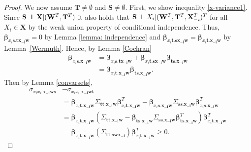 \documentclass[11pt,a4paper]{article}
\theoremstyle{definition}
\theoremstyle{remark}
\newcommand\ci{\protect\mathpalette{\protect\independenT}{\perp}}
\def\independenT#1#2{\mathrel{\rlap{$#1#2$}\mkern2mu{#1#2}}}
\begin{document}
\begin{proof}
We now assume $\mathbf{T} \neq \emptyset$ and $\mathbf{S} \neq \emptyset$.  
First, we show inequality \ref{x-variance1}.  Since $\mathbf{S} \ci \mathbf{X} | (\mathbf{W}^T , \mathbf{T}^T)$ it also holds that $\mathbf{S} \ci X_i | (\mathbf{W}^T, \mathbf{T}^T, \mathbf{X}_{-i}^T)^T$ for all $X_i \in \mathbf{X}$ by the weak union property of conditional independence. %
Thus, $\boldsymbol{\beta}_{x_i\mathbf{s}.\mathbf{tx_{-i}w}} = 0$ by Lemma \ref{lemma: independence} and $\boldsymbol{\beta}_{x_i\mathbf{t}.\mathbf{sx_{-i}w}} = \boldsymbol{\beta}_{x_i\mathbf{t}.\mathbf{x_{-i}w}}$ by Lemma~\ref{Wermuth}. Hence, by Lemma \ref{Cochran}
\[
\begin{aligned}
\boldsymbol{\beta}_{x_i\mathbf{s}.\mathbf{x_{-i}w}} &= \boldsymbol{\beta}_{x_i\mathbf{s}.\mathbf{tx_{-i}w}} + \boldsymbol{\beta}_{x_i\mathbf{t}.\mathbf{sx_{-i}w}}\boldsymbol{\beta}_{\mathbf{ts}.\mathbf{x_{-i}w}} \\ &=\boldsymbol{\beta}_{x_i\mathbf{t}.\mathbf{x_{-i}w}} \boldsymbol{\beta}_{\mathbf{ts}.\mathbf{x_{-i}w}}.
\end{aligned}
\]
Then by Lemma \ref{convarsets},
\[
\begin{aligned}
\sigma_{x_ix_i.\mathbf{x_{-i}ws}} &- \sigma_{x_ix_i.\mathbf{x_{-i}wt}} \\
&=\boldsymbol{\beta}_{x_i\mathbf{t}.\mathbf{x_{-i}w}} \Sigma_{\mathbf{tt}.\mathbf{x_{-i}w}} \boldsymbol{\beta}^T_{x_i\mathbf{t}.\mathbf{x_{-i}w}}  -
\boldsymbol{\beta}_{x_i\mathbf{s}.\mathbf{x_{-i}w}} \Sigma_{\mathbf{ss}.\mathbf{x_{-i}w}} \boldsymbol{\beta}^T_{x_i\mathbf{s}.\mathbf{x_{-i}w}} \\
&= \boldsymbol{\beta}_{x_i\mathbf{t}.\mathbf{x_{-i}w}}( \Sigma_{\mathbf{tt}.\mathbf{x_{-i}w}} 
- \boldsymbol{\beta}_{\mathbf{ts}.\mathbf{x_{-i}w}} \Sigma_{\mathbf{ss}.\mathbf{x_{-i}w}} \boldsymbol{\beta}_{\mathbf{ts}.\mathbf{x_{-i}w}}^T)
\boldsymbol{\beta}^T_{x_i\mathbf{t}.\mathbf{x_{-i}w}} \\
&=  \boldsymbol{\beta}_{x_i\mathbf{t}.\mathbf{x_{-i}w}}
(\Sigma_{\mathbf{tt}.\mathbf{swx_{-i}}})
\boldsymbol{\beta}^T_{x_i\mathbf{t}.\mathbf{x_{-i}w}} \geq 0.
\end{aligned} 
\]



\end{proof}
\end{document}
